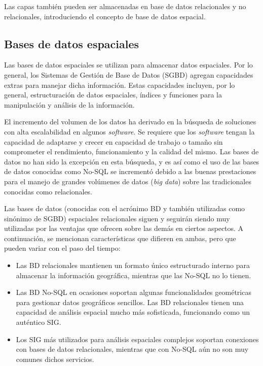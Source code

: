 Las capas también pueden ser almacenadas en base de datos relacionales y no relacionales, introduciendo el concepto de base de datos espacial.


\subsection{Bases de datos espaciales}

Las bases de datos espaciales se utilizan para almacenar datos espaciales. Por lo general, los Sistemas de Gestión de Base de Datos (SGBD) agregan capacidades extras para manejar dicha información. Estas capacidades incluyen, por lo general, estructuración de datos espaciales, índices y funciones para la manipulación y análisis de la información.

El incremento del volumen de los datos ha derivado en la búsqueda de soluciones con alta escalabilidad en algunos \textit{software}. Se requiere que los \textit{software} tengan la capacidad de adaptarse y crecer en capacidad de trabajo o tamaño sin comprometer el rendimiento, funcionamiento y la calidad del mismo. Las bases de datos no han sido la excepción en esta búsqueda, y es así como el uso de las bases de datos conocidas como No-SQL se incrementó debido a las buenas prestaciones para el manejo de grandes volúmenes de datos (\textit{big data}) sobre las tradicionales conocidas como relacionales. 

Las bases de datos (conocidas con el acrónimo BD y también utilizadas como sinónimo de SGBD) espaciales relacionales siguen y seguirán siendo muy utilizadas por las ventajas que ofrecen sobre las demás en ciertos aspectos. A continuación, se mencionan características que difieren en ambas, pero que pueden variar con el paso del tiempo:

\begin{itemize}
    \item Las BD relacionales mantienen un formato único estructurado interno para almacenar la información geográfica, mientras que las No-SQL no lo tienen.
    \item Las BD No-SQL en ocasiones soportan algunas funcionalidades geométricas para gestionar datos geográficos sencillos. Las BD relacionales tienen una capacidad de análisis espacial mucho más sofisticada, funcionando como un auténtico SIG.
    \item Los SIG más utilizados para análisis espaciales complejos soportan conexiones con bases de datos relacionales, mientras que con No-SQL aún no son muy comunes dichos servicios.
\end{itemize}

